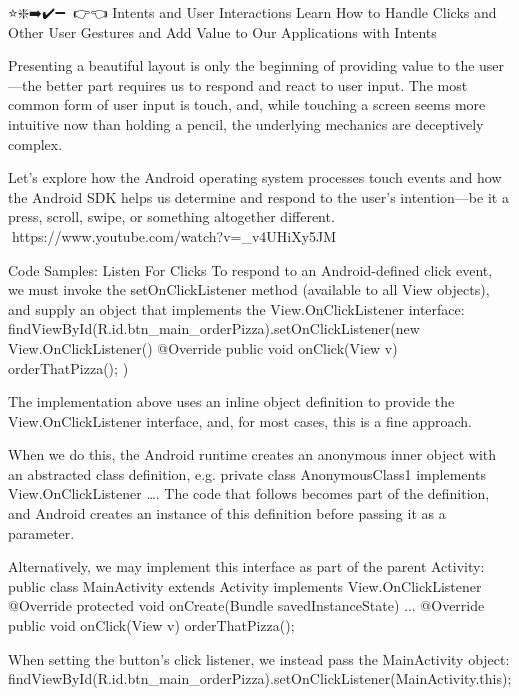 ⭐❇️➡️✔️➖🔗💎👉👈
Intents and User Interactions
        Learn How to Handle Clicks and Other User Gestures and Add Value to Our Applications with Intents

        Presenting a beautiful layout is only the beginning of providing value to the user—the better part requires us to respond and react to user input. The most common form of user input is touch, and, while touching a screen seems more intuitive now than holding a pencil, the underlying mechanics are deceptively complex.

        Let’s explore how the Android operating system processes touch events and how the Android SDK helps us determine and respond to the user’s intention—be it a press, scroll, swipe, or something altogether different.
            🔗https://www.youtube.com/watch?v=_v4UHiXy5JM

Code Samples:
    Listen For Clicks
        To respond to an Android-defined click event, we must invoke the setOnClickListener method (available to all View objects), and supply an object that implements the View.OnClickListener interface:
            findViewById(R.id.btn_main_orderPizza).setOnClickListener(new View.OnClickListener() {
                @Override
                public void onClick(View v) {
                    orderThatPizza();
                }
            })
            
        The implementation above uses an inline object definition to provide the View.OnClickListener interface, and, for most cases, this is a fine approach.

        When we do this, the Android runtime creates an anonymous inner object with an abstracted class definition, e.g. private class AnonymousClass1 implements View.OnClickListener {…}. The code that follows becomes part of the definition, and Android creates an instance of this definition before passing it as a parameter.

        Alternatively, we may implement this interface as part of the parent Activity:
            public class MainActivity extends Activity implements View.OnClickListener {
                @Override
                protected void onCreate(Bundle savedInstanceState) {
                    ...
                }            
                @Override
                public void onClick(View v) {
                    orderThatPizza();
                }
            }
            
        When setting the button’s click listener, we instead pass the MainActivity object:
            findViewById(R.id.btn_main_orderPizza).setOnClickListener(MainActivity.this);

